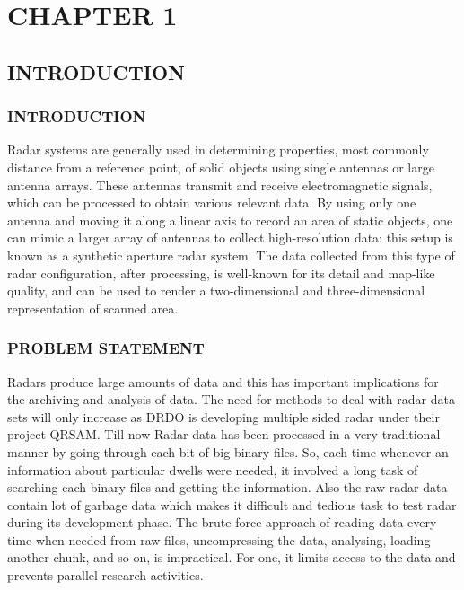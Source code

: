 \documentclass[14pt]{article} %
\date{}
\begin{document}
 \tableofcontents
\listoffigures
\chapter{CHAPTER 1}

\section{INTRODUCTION}

\subsection{INTRODUCTION}
         Radar systems are generally used in determining properties, most commonly distance from a reference point, of solid objects using single antennas or large antenna arrays. These antennas transmit and receive electromagnetic signals, which can be processed to obtain various relevant data. By using only one antenna and moving it along a linear axis to record an area of static objects, one can mimic a larger array of antennas to collect high-resolution data: this setup is known as a synthetic aperture radar system. The data collected from this type of radar configuration, after processing, is well-known for its detail and map-like quality, and can be used to render a two-dimensional and three-dimensional representation of scanned area.

\subsection{PROBLEM STATEMENT}
           Radars produce large amounts of data and this has important implications for the archiving and analysis of data. The need for methods to deal with radar data sets will only increase as DRDO is developing multiple sided radar under their project QRSAM. Till now Radar data has been processed in a very traditional manner by going through each bit of big binary files. So, each time whenever an information about particular dwells were needed, it involved a long task of searching each binary files and getting the information. Also the raw radar data contain lot of garbage data which makes it difficult and tedious task to test radar during its development phase. The brute force approach of reading data every time when needed from raw files, uncompressing the data, analysing, loading another chunk, and so on, is impractical. For one, it limits access to the data and prevents parallel research activities.
\end{document}
